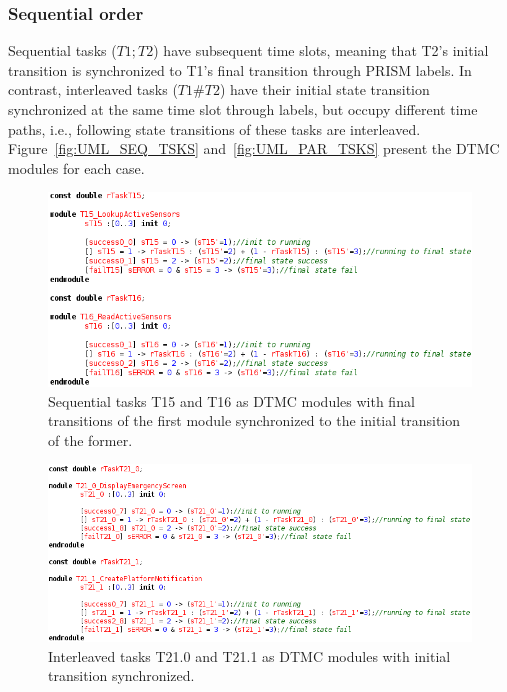 \subsubsection{Sequential order}

Sequential tasks ($T1;T2$) have subsequent time slots, meaning that T2's initial transition is synchronized to T1's final transition through PRISM labels. In contrast, interleaved tasks ($T1\#T2$) have their initial state transition synchronized at the same time slot through labels, but occupy different time paths, i.e., following state transitions of these tasks are interleaved.  Figure~\ref{fig:UML_SEQ_TSKS} and~\ref{fig:UML_PAR_TSKS} present the DTMC modules for each case.

\begin{figure}[ht!]
\centering
\includegraphics[width=1\textwidth]{imgs/PRISM_SEQ_TSKS.png}
\caption{Sequential tasks T15 and T16 as DTMC modules with final transitions of the first module synchronized to the initial transition of the former.}
\label{fig:PRISM_SEQ_TSKS}
\end{figure}

\begin{figure}[ht!]
\centering
\includegraphics[width=1\textwidth]{imgs/PRISM_PAR_TSKS.png}
\caption{Interleaved tasks T21.0 and T21.1 as DTMC modules with initial transition synchronized.}
\label{fig:PRISM_PAR_TSKS}
\end{figure}

